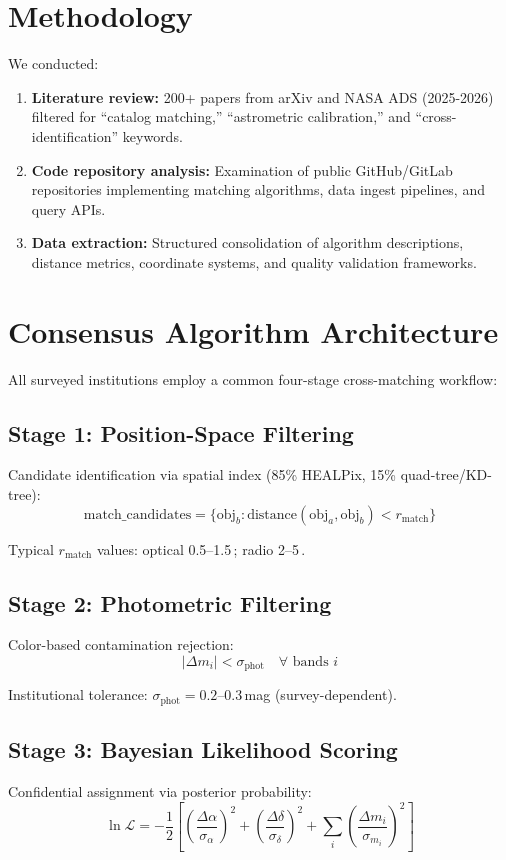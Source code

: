 \documentclass[11pt,twocolumn]{article}
\begin{document}
\section{Methodology}

We conducted:
\begin{enumerate}
\item \textbf{Literature review:} 200+ papers from arXiv and NASA ADS (2025-2026) filtered for ``catalog matching,'' ``astrometric calibration,'' and ``cross-identification'' keywords.
\item \textbf{Code repository analysis:} Examination of public GitHub/GitLab repositories implementing matching algorithms, data ingest pipelines, and query APIs.
\item \textbf{Data extraction:} Structured consolidation of algorithm descriptions, distance metrics, coordinate systems, and quality validation frameworks.
\end{enumerate}

\section{Consensus Algorithm Architecture}

All surveyed institutions employ a common four-stage cross-matching workflow:

\subsection{Stage 1: Position-Space Filtering}
Candidate identification via spatial index (85\% HEALPix, 15\% quad-tree/KD-tree):
$$\text{match\_candidates} = \{\text{obj}_b : \text{distance}(\text{obj}_a, \text{obj}_b) < r_{\text{match}}\}$$

Typical $r_{\text{match}}$ values: optical 0.5--1.5\,\arcsec; radio 2--5\,\arcsec.

\subsection{Stage 2: Photometric Filtering}
Color-based contamination rejection:
$$|\Delta m_i| < \sigma_{\text{phot}} \quad \forall \text{ bands } i$$

Institutional tolerance: $\sigma_{\text{phot}} = 0.2$--0.3\,mag (survey-dependent).

\subsection{Stage 3: Bayesian Likelihood Scoring}
Confidential assignment via posterior probability:
$$\ln \mathcal{L} = -\frac{1}{2} \left[ \left(\frac{\Delta\alpha}{\sigma_\alpha}\right)^2 + \left(\frac{\Delta\delta}{\sigma_\delta}\right)^2 + \sum_i \left(\frac{\Delta m_i}{\sigma_{m_i}}\right)^2 \right]$$
\end{document}
